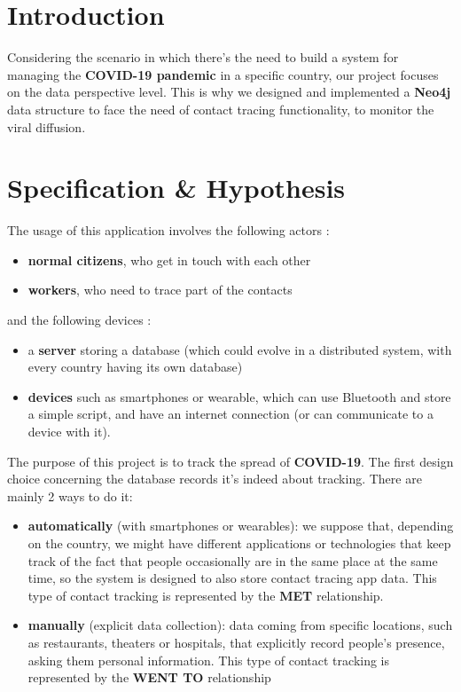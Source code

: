 \documentclass{article}[IEEEtran]
\begin{document}
\section{Introduction}\label{sec:intro}

Considering the scenario in which there’s the need to build a system for managing the \textbf{COVID-19 pandemic} in a specific country, our project focuses on the data perspective level. This is why we designed and implemented a \textbf{Neo4j} \cite{neo4j2012world} data structure to face the need of contact tracing functionality, to monitor the viral diffusion. 


\section{Specification \& Hypothesis}\label{sec:spec-hyp}

The usage of this application involves the following actors :
\begin{itemize}
\item \textbf{normal citizens}, who get in touch with each other
\item \textbf{workers}, who need to trace part of the contacts
\end{itemize}
and the following devices :
\begin{itemize}
\item a \textbf{server} storing a database (which could evolve in a distributed system, with every country having its own database)
\item \textbf{devices} such as smartphones or wearable, which can use Bluetooth and store a simple script, and have an internet connection (or can communicate to a device with it).
\end{itemize}

The purpose of this project is to track the spread of \textbf{COVID-19}. The first design choice concerning the database records it's indeed about tracking. 
There are mainly 2 ways to do it:
\begin{itemize}

\item \textbf{automatically} (with smartphones or wearables): we suppose that, depending on the country, we might have different applications or technologies that keep track of the fact that people occasionally are in the same place at the same time, so the system is designed to also store contact tracing app data. This type of contact tracking is represented by the \textbf{MET} relationship.

\item \textbf{manually} (explicit data collection): data coming from specific locations, such as restaurants, theaters or hospitals, that explicitly record people’s presence, asking them personal information.  This type of contact tracking is represented by the \textbf{WENT TO} relationship

\end{itemize}
\end{document}
